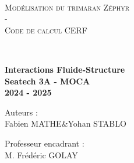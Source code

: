 \documentclass{article}
\title{\titre}
\author{\auteur \& \auteurs}
\date{\today}
\numberwithin{figure}{section}
\numberwithin{table}{section}
\newcommand{\titre}{Modélisation du trimaran Zéphyr\\-\\\vspace{0.5cm} Code de calcul CERF}
\newcommand{\sujet}{Interactions Fluide-Structure}
\newcommand{\sujets}{Seatech 3A - MOCA}
\newcommand{\auteur}{Fabien MATHE}
\newcommand{\auteurs}{Yohan STABLO}
\newcommand{\referent}{M. Frédéric GOLAY}
\begin{document}
\begin{titlepage}

    \centering
    
    \vspace*{4cm}
    
    \makebox[0.7\linewidth]{\hrulefill}\\[0.2cm]
    
    \vspace{0.5cm}
    \begin{minipage}{\textwidth}
        \centering
        {\fontsize{28}{48}\selectfont \textsc{\titre}}\\[0.2cm]
    \end{minipage}
    \vspace{0.3cm}
    
    \makebox[0.8\linewidth]{\hrulefill}\\[0.2cm]
    
    \vspace{2cm}
    
    \large{\Large \textbf{\sujet}}\\
    \large{\textbf{\sujets}}\\

    \vspace{0.5cm}
    \large{\textbf{2024 - 2025}}

    
    \vspace{1cm}
    
    {
    \centering
        Auteurs : \\
        \auteur\;\&\;\auteurs

        \vspace{0.8 cm}

        Professeur encadrant : \\
        \referent

    }
    
\end{titlepage}
\ClearShipoutPictureBG
\newpage
\end{document}
